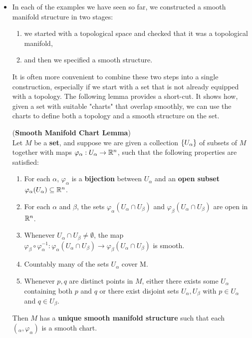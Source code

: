 \documentclass[11pt]{article}
\begin{document}
\begin{itemize}
\item In each of the examples we have seen so far, we constructed a smooth manifold structure in two stages: 
\begin{enumerate}
\item we started with a topological space and checked that it was a topological manifold,
\item and then we specified a smooth structure.
\end{enumerate}
It is often more convenient to combine these two steps into a single construction, especially if we start with a set that is not already equipped with a topology. The following lemma provides a short-cut. It shows how, given a set with suitable "charts" that overlap smoothly, we can use the charts to define both a topology and a smooth structure on the set.
\begin{lemma}(\textbf{Smooth Manifold Chart Lemma}) \citep{lee2003introduction}\\
Let $M$ be a \textbf{set}, and suppose we are given a collection $\left\{U_{\alpha}\right\}$ of subsets of $M$ together with maps $\varphi_{\alpha}: U_{\alpha}\rightarrow {\mathbb R}^n$, such that the following properties are satisfied:
\begin{enumerate}
\item For each $\alpha$, $\varphi_{\alpha}$ is a \textbf{bijection} between $U_{\alpha}$  and an \textbf{open subset} $\varphi_{\alpha}(U_{\alpha}) \subseteq {\mathbb R}^n$.
\item For each $\alpha$ and $\beta$, the sets $\varphi_{\alpha}(U_{\alpha} \cap U_{\beta})$ and $\varphi_{\beta}(U_{\alpha} \cap U_{\beta})$ are open in ${\mathbb R}^n$.
\item Whenever $U_{\alpha} \cap U_{\beta}\neq \emptyset$, the map $\varphi_{\beta} \circ \varphi_{\alpha}^{-1}: \varphi_{\alpha}(U_{\alpha} \cap U_{\beta})\rightarrow \varphi_{\beta}(U_{\alpha} \cap U_{\beta})$ is smooth.
\item Countably many of the sets $U_{\alpha}$ cover M.
\item Whenever $p, q$ are distinct points in $M$, either there exists some  $U_{\alpha}$ containing both $p$ and $q$ or there exist disjoint sets $U_{\alpha}, U_{\beta}$ with $p \in U_{\alpha}$ and $q \in U_{\beta}$.
\end{enumerate}
Then $M$ has a \textbf{unique smooth manifold structure} such that each $(_{\alpha}, \varphi_{\alpha})$ is a smooth chart.
\end{lemma}


\end{itemize}
\end{document}
